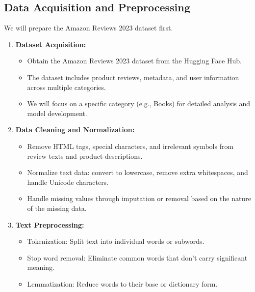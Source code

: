 \documentclass{article}
\begin{document}
\subsection{Data Acquisition and Preprocessing} 
We will prepare the Amazon Reviews 2023 dataset first.
\begin{enumerate}
    \item \textbf{Dataset Acquisition:} 
    \begin{itemize}
        \item Obtain the Amazon Reviews 2023 dataset from the Hugging Face Hub.
        \item The dataset includes product reviews, metadata, and user information across multiple categories.
        \item We will focus on a specific category (e.g., Books) for detailed analysis and model development.
    \end{itemize}
    
    \item \textbf{Data Cleaning and Normalization:}
    \begin{itemize}
        \item Remove HTML tags, special characters, and irrelevant symbols from review texts and product descriptions.
        \item Normalize text data: convert to lowercase, remove extra whitespaces, and handle Unicode characters.
        \item Handle missing values through imputation or removal based on the nature of the missing data.
    \end{itemize}
    
    \item \textbf{Text Preprocessing:}
    \begin{itemize}
        \item Tokenization: Split text into individual words or subwords.
        \item Stop word removal: Eliminate common words that don't carry significant meaning.
        \item Lemmatization: Reduce words to their base or dictionary form.
    \end{itemize}
    
\end{enumerate}
\end{document}

